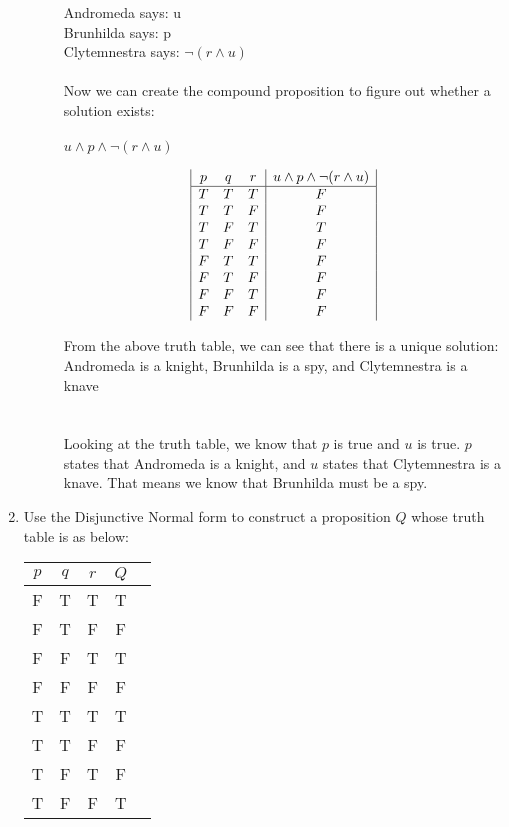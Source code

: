 \documentclass[12pt, oneside]{article}
\begin{document}
\begin{enumerate}
\begin{description}
    Andromeda says: u\\
    Brunhilda says: p\\
    Clytemnestra says: $\lnot (r \wedge u)$\\\\

    Now we can create the compound proposition to figure out whether a solution exists: \\\\
    $u \wedge p\wedge \lnot (r \wedge u)$
    
    \begin{displaymath}
        \begin{array}{|c c c|c|}
        p & q & r & u \wedge p \wedge \lnot (r \wedge u)\\
        \hline
        T & T & T & F\\
        T & T & F & F\\
        T & F & T & T\\
        T & F & F & F\\
        F & T & T & F\\
        F & T & F & F\\
        F & F & T & F\\
        F & F & F & F\\
        \end{array}
    \end{displaymath}

    From the above truth table, we can see that there is a unique solution: Andromeda is a knight, Brunhilda is a spy, and Clytemnestra is a knave\\\\\\
    Looking at the truth table, we know that $p$ is true and $u$ is true. $p$ states that Andromeda is a knight, and $u$ states that Clytemnestra is a knave. That means we know that Brunhilda must be a spy.
\end{description}

\item Use the Disjunctive Normal form to construct a proposition $Q$ whose truth table is as below:

\begin{center}
\begin{tabular}{|c|c|c|c|c|}
\hline
$p$ & $q$ & $r$ & $Q$ \\ \hline \hline
F&T&T& T \\ \hline
F&T&F& F \\ \hline
F&F&T& T \\ \hline
F&F&F& F \\ \hline
T&T&T& T \\ \hline
T&T&F& F \\ \hline
T&F&T& F \\ \hline
T&F&F& T \\ \hline


\end{tabular}
\end{center}
\end{enumerate}
\end{document}
